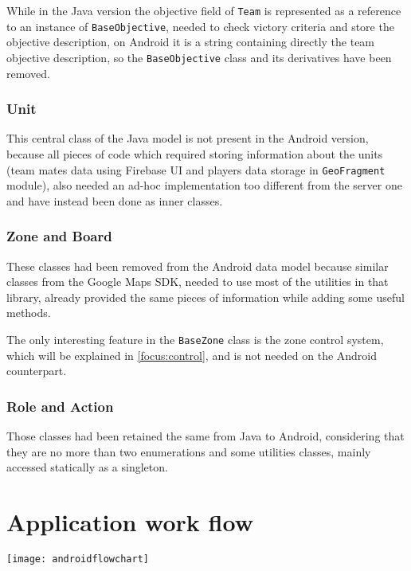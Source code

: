 				While in the Java version the objective field of \lstinline|Team| is represented as a reference to an instance of \lstinline|BaseObjective|, needed to check victory criteria and store the objective description, on Android it is a string containing directly the team objective description, so the \lstinline|BaseObjective| class and its derivatives have been removed.
			
			\subsubsection{Unit}
			
				This central class of the Java model is not present in the Android version, because all pieces of code which required storing information about the units (team mates data using Firebase UI and players data storage in \lstinline|GeoFragment| module), also needed an ad-hoc implementation too different from the server one and have instead been done as inner classes.
			
			\subsubsection{Zone and Board}
			
				These classes had been removed from the Android data model because similar classes from the Google Maps SDK, needed to use most of the utilities in that library, already provided the same pieces of information while adding some useful methods.
				
				The only interesting feature in the \lstinline|BaseZone| class is the zone control system, which will be explained in \autoref{focus:control}, and is not needed on the Android counterpart.
			
			\subsubsection{Role and Action}
			
				Those classes had been retained the same from Java to Android, considering that they are no more than two enumerations and some utilities classes, mainly accessed statically as a singleton.
			
	\section{Application work flow}\label{app:workflow}
	
		\texttt{[image: androidflowchart]}
		
